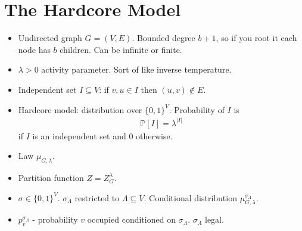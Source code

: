 \documentclass[11pt]{article} \usepackage{amssymb}
\renewcommand{\P}[1]{{\mathbb{P}}\left[{#1}\right]}
\newcommand{\act}{\lambda}
\begin{document}
\section{The Hardcore Model}
\begin{itemize}
\item Undirected graph $G=(V,E)$. Bounded degree $b+1$, so if you root
  it each node has $b$ children. Can be infinite or finite.
\item $\act>0$ activity parameter. Sort of like inverse
  temperature.
\item Independent set $I \subseteq V$: if $v,u \in I$ then $(u,v) \not
  \in E$.
\item Hardcore model: distribution over $\{0,1\}^V$. Probability of
  $I$ is
  \begin{align*}
    \P{I} = \act^{|I|}
  \end{align*}
  if $I$ is an independent set and 0 otherwise.
\item Law $\mu_{G,\act}$.
\item Partition function $Z=Z_G^\act$.
\item $\sigma \in \{0,1\}^V$. $\sigma_\Lambda$ restricted to $\Lambda
  \subseteq V$. Conditional distribution
  $\mu_{G,\act}^{\sigma_\Lambda}$.
\item $p_v^{\sigma_\Lambda}$ - probability $v$ occupied conditioned
  on $\sigma_\Lambda$. $\sigma_\Lambda$ legal.
\end{itemize}
\end{document}

